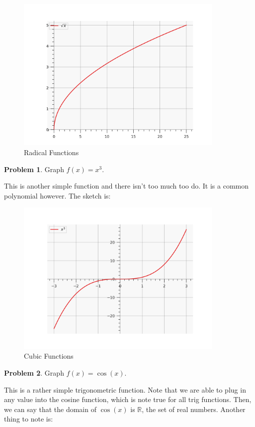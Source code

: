 \documentclass[12pt]{article}
\theoremstyle{definition}
\newtheorem{problem}{Problem}
\begin{document}
\begin{figure}[H]
    \centering
    \includegraphics[width=10cm, keepaspectratio]{graph_10.png}
    \caption{Radical Functions}
    \label{fig:fig10}
\end{figure}

\begin{problem}
Graph $f(x)=x^3$.
\end{problem}

This is another simple function and there isn't too much too do.
It is a common polynomial however.
The sketch is:

\begin{figure}[H]
    \centering
    \includegraphics[width=10cm, keepaspectratio]{graph_11.png}
    \caption{Cubic Functions}
    \label{fig:fig11}
\end{figure}

\begin{problem}
Graph $f(x)=\cos(x)$.
\end{problem}

This is a rather simple trigonometric function.
Note that we are able to plug in any value into the cosine function, which is note true for all trig functions.
Then, we can say that the domain of $\cos(x)$ is $\mathbb{R}$, the set of real numbers.
Another thing to note is:
\end{document}
